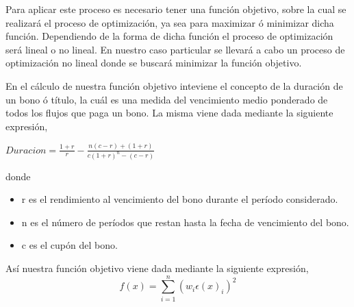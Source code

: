 \vspace{0.5cm}

\hspace{0.4cm} Para aplicar este proceso es necesario tener una funci\'on objetivo, sobre la cual se realizar\'a el proceso de optimizaci\'on, ya sea para maximizar \'o minimizar dicha funci\'on. Dependiendo de la forma de dicha funci\'on el proceso de optimizaci\'on ser\'a lineal o no lineal. En nuestro caso particular se llevar\'a a cabo un proceso de optimizaci\'on no lineal donde se buscar\'a minimizar la funci\'on objetivo.

\vspace{0.5cm}

\hspace{0.4cm} En el c\'alculo de nuestra funci\'on objetivo inteviene el concepto de la duraci\'on de un bono \'o t\'itulo, la cu\'al es una medida del vencimiento medio ponderado de todos los flujos que paga un bono. La misma viene dada mediante la siguiente expresi\'on, \\

\begin{center}

$\displaystyle{Duracion = \frac{1+r}{r} - \frac{n(c-r)+(1+r)}{c(1+r)^{n}-(c-r)}}$

\end{center}

\vspace{0.5cm}

\newpage

\noindent donde

\begin{itemize}
  \item r es el rendimiento al vencimiento del bono durante el per\'iodo considerado.
  \item n es el n\'umero de per\'iodos que restan hasta la fecha de vencimiento del bono.
  \item c es el cup\'on del bono.
\end{itemize}


\vspace{0.5cm}

\hspace{0.4cm} As\'i nuestra funci\'on objetivo viene dada mediante la siguiente expresi\'on,\\

\begin{equation}\label{ecua2}
  f(x) = \sum_{i=1}^{n} (w_{i}\epsilon(x)_{i} )^2
\end{equation}



